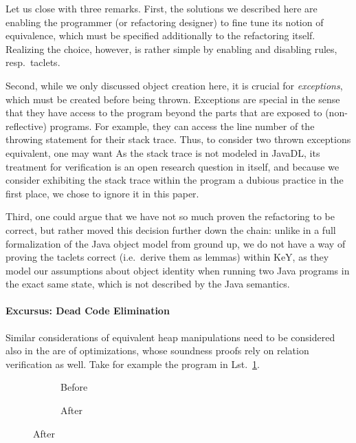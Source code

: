 Let us close with three remarks. First, the solutions we described here are enabling the programmer (or refactoring designer) to fine tune its notion of equivalence, which must be specified additionally to the refactoring itself. Realizing the choice, however, is rather simple by enabling and disabling rules, resp.\ taclets.

Second, while we only discussed object creation here, it is crucial for \emph{exceptions}, which must be created before being thrown. 
Exceptions are special in the sense that they have access to the program beyond the parts that are exposed to (non-reflective) programs.
For example, they can access the line number of the throwing statement for their stack trace. Thus, to consider two thrown exceptions equivalent, 
one may want 
As the stack trace is not modeled in JavaDL, its treatment for verification is an open research question in itself, and because we consider exhibiting the stack trace
within the program a dubious practice in the first place, we chose to ignore it in this paper.

Third, one could argue that we have not so much proven the refactoring to be correct,
but rather moved this decision further down the chain: unlike in a full formalization of the Java object model from ground up, %
we do not have a way of proving the taclets correct (i.e.\ derive them as lemmas) within KeY, as they model our assumptions about object identity when running two Java programs in the exact same state, which is not described by the Java semantics.


\paragraph*{Excursus: Dead Code Elimination}
Similar considerations of equivalent heap manipulations need to be considered also in the are of optimizations, whose soundness proofs rely on relation verification as well.
Take for example the program in Lst.~\ref{lst:xisnewxisnew}.
\begin{figure}
  \centering
  \begin{subfigure}[b]{.2\linewidth}
    
    \caption{Before}
  \end{subfigure}\hspace{1cm}
  \begin{subfigure}[b]{.2\linewidth}
    
    \caption{After}
  \end{subfigure}
\label{lst:xisnewxisnew}
\end{figure}

